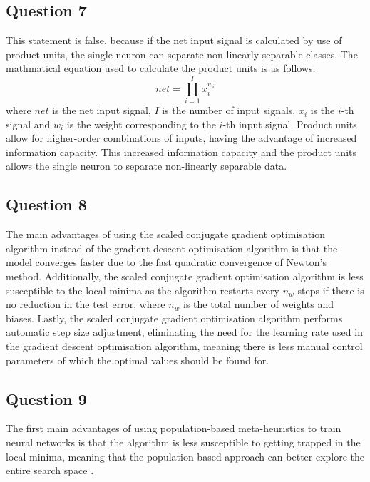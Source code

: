 \documentclass[10pt]{article}
\begin{document}
\subsection*{Question 7}

This statement is false, because if the net input signal is calculated by use of product units, the single
neuron can separate non-linearly separable classes. The mathmatical equation used to calculate the product units
is as follows.
\begin{equation}
    net = \prod_{i=1}^{I} x_{i}^{w_i}
\end{equation}
where $net$ is the net input signal, $I$ is the number of input signals, $x_i$ is the $i$-th signal and $w_i$
is the weight corresponding to the $i$-th input signal. Product units allow for higher-order
combinations of inputs, having the advantage of increased information capacity. This increased
information capacity and the product units allows the single neuron to separate non-linearly
separable data.

\subsection*{Question 8}

The main advantages of using the scaled conjugate gradient optimisation algorithm instead of
the gradient descent optimisation algorithm is that the model converges faster due to the
fast quadratic convergence of Newton's method. Additionally, the scaled conjugate gradient
optimisation algorithm is less susceptible to the local minima as the algorithm restarts every
$n_w$ steps if there is no reduction in the test error, where $n_w$ is the total number of
weights and biases. Lastly, the scaled conjugate gradient optimisation algorithm performs
automatic step size adjustment, eliminating the need for the learning rate used in the gradient
descent optimisation algorithm, meaning there is less manual control parameters of which
the optimal values should be found for.

\subsection*{Question 9}

The first main advantages of using population-based meta-heuristics to train neural networks is that the algorithm
is less susceptible to getting trapped in the local minima, meaning that the population-based approach
can better explore the entire search space \cite{sciencedirect_metaheuristics}.
\end{document}
